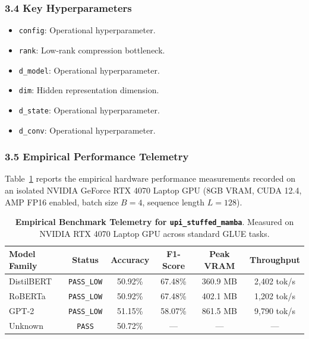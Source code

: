 \subsubsection*{3.4 Key Hyperparameters}
\begin{itemize}
    \item \texttt{config}: Operational hyperparameter.
    \item \texttt{rank}: Low-rank compression bottleneck.
    \item \texttt{d\_model}: Operational hyperparameter.
    \item \texttt{dim}: Hidden representation dimension.
    \item \texttt{d\_state}: Operational hyperparameter.
    \item \texttt{d\_conv}: Operational hyperparameter.
\end{itemize}

\subsubsection*{3.5 Empirical Performance Telemetry}
Table~\ref{tab:telemetry_upi_stuffed_mamba} reports the empirical hardware performance measurements recorded on an isolated NVIDIA GeForce RTX 4070 Laptop GPU (8GB VRAM, CUDA 12.4, AMP FP16 enabled, batch size $B=4$, sequence length $L=128$).

\begin{table}[h]
\centering
\small
\caption{\textbf{Empirical Benchmark Telemetry for \texttt{upi\_stuffed\_mamba}}. Measured on NVIDIA RTX 4070 Laptop GPU across standard GLUE tasks.}
\label{tab:telemetry_upi_stuffed_mamba}
\begin{tabular*}{\columnwidth}{@{\extracolsep{\fill}}lccccc}
\toprule
\textbf{Model Family} & \textbf{Status} & \textbf{Accuracy} & \textbf{F1-Score} & \textbf{Peak VRAM} & \textbf{Throughput} \\
\midrule
DistilBERT & \texttt{PASS\_LOW} & 50.92\% & 67.48\% & 360.9 MB & 2,402 tok/s \\
RoBERTa & \texttt{PASS\_LOW} & 50.92\% & 67.48\% & 402.1 MB & 1,202 tok/s \\
GPT-2 & \texttt{PASS\_LOW} & 51.15\% & 58.07\% & 861.5 MB & 9,790 tok/s \\
Unknown & \texttt{PASS} & 50.72\% & --- & --- & --- \\
\bottomrule
\end{tabular*}
\end{table}

